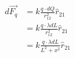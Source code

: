\documentclass{article}
\begin{document}
\begin{eqnarray}
  d\vec{F_q} &= k\frac{q \cdot dQ}{r_{12}^2}\hat{r}_{21}\\
  &= k\frac{q \cdot \lambda dL}{r_{12}^2}\hat{r}_{21} \\
  &= k\frac{q\cdot \lambda dL}{L^2+x^2}\hat{r}_{21} \\

\end{eqnarray}
\end{document}
